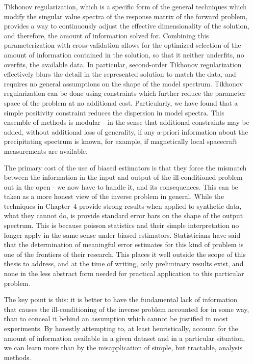 Tikhonov regularization, which is a specific form of the general techniques which modify the singular value spectra of the response matrix of the forward problem, provides a way to continuously adjust the effective dimensionality of the solution, and therefore, the amount of information solved for. Combining this parameterization with cross-validation allows for the optimized selection  of the amount of information contained in the solution, so that it neither underfits, no overfits, the available data. In particular, second-order Tikhonov regularization effectively blurs the detail in the represented solution to match the data, and requires no general assumptions on the shape of the model spectrum. Tikhonov regularization can be done using constraints which further reduce the parameter space of the problem at no additional cost. Particularly, we have found that a simple positivity constraint reduces the dispersion in model spectra. This ensemble of methods is modular - in the sense that additional constraints may be added, without additional loss of generality, if any a-priori information about the precipitating spectrum is known, for example, if magnetically local spacecraft measurements are available.

The primary cost of the use of biased estimators is that they force the mismatch between the information in the input and output of the ill-conditioned problem out in the open - we now have to handle it, and its consequences. This can be taken as a more honest view of the inverse problem in general. While the techniques in Chapter~4 provide strong results when applied to synthetic data, what they cannot do, is provide standard error bars on the shape of the output spectrum. This is because poisson statistics and their simple interpretation no longer apply in the same sense under biased estimators. Statisticians have said that the determination of meaningful error estimates for this kind of problem is one of the frontiers of their research. This places it well outside the scope of this thesis to address, and at the time of writing, only preliminary results exist, and none in the less abstract form needed for practical application to this particular problem. 

The key point is this: it is better to have the fundamental lack of information that causes the ill-conditioning of the inverse problem accounted for in some way, than to conceal it behind an assumption which cannot be justified in most experiments. By honestly attempting to, at least heuristically, account for the amount of information available in a given dataset and in a particular situation, we can learn more than by the misapplication of simple, but tractable, analysis methods.

